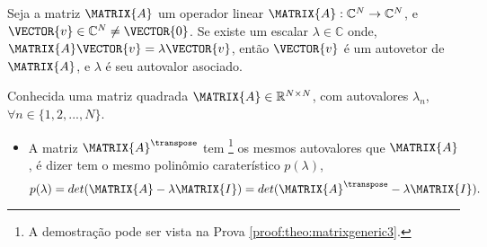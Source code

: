 \begin{definition}\label{def:matrixgeneric0}
Seja a matriz $\MATRIX{A}$ um operador linear $\MATRIX{A}: \mathbb{C}^{N} \rightarrow \mathbb{C}^{N}$,  
e $\VECTOR{v} \in \mathbb{C}^{N} \neq\VECTOR{0}$. Se existe um escalar $\lambda \in \mathbb{C}$ onde, 
$\MATRIX{A}\VECTOR{v}=\lambda\VECTOR{v}$,
então $\VECTOR{v}$ é um autovetor de $\MATRIX{A}$, e $\lambda$ é seu autovalor asociado.
\end{definition}


\begin{theorem}\label{theo:matrixgeneric3}
Conhecida uma matriz quadrada $\MATRIX{A} \in \mathbb{R}^{N \times N}$, 
com  autovalores $\lambda_n$, $\forall n \in \{1, 2, ..., N\}$.
\begin{itemize}
\item A matriz $\MATRIX{A}^{\transpose}$ tem
\footnote{A demostração pode ser vista na Prova \ref{proof:theo:matrixgeneric3}.} 
os mesmos autovalores que $\MATRIX{A}$, é dizer tem o mesmo polinômio caraterístico $p(\lambda)$,
\begin{equation}
p(\lambda)=det(\MATRIX{A}-\lambda \MATRIX{I})=det(\MATRIX{A}^{\transpose}-\lambda \MATRIX{I}).
\end{equation}
\end{itemize}
\end{theorem}
